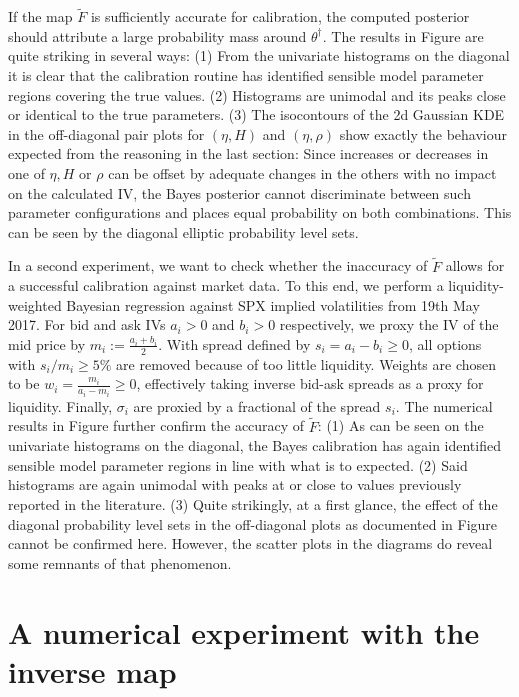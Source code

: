 \documentclass{article}
\theoremstyle{remark}
\begin{document}
If the map $\widetilde{F}$ is sufficiently accurate for calibration, the
computed posterior should attribute a large probability mass around
$\theta^\dagger$. The results in Figure 
are quite striking in several ways: (1) From the univariate histograms on the
diagonal it is clear that the calibration routine has identified sensible
model parameter regions covering the true values. (2) Histograms are unimodal
and its peaks close or identical to the true parameters. (3) The isocontours
of the 2d Gaussian KDE in the off-diagonal pair plots for $(\eta, H)$ and
$(\eta, \rho)$ show exactly the behaviour expected from the reasoning in the
last section: Since increases or decreases in one of $\eta, H$ or $\rho$ can
be offset by adequate changes in the others with no impact on the calculated
IV, the Bayes posterior cannot discriminate between such parameter
configurations and places equal probability on both combinations. This can be
seen by the diagonal elliptic probability level sets.

In a second experiment, we want to check whether the inaccuracy of
$\widetilde{F}$ allows for a successful calibration against market data. To
this end, we perform a liquidity-weighted Bayesian regression against SPX
implied volatilities from 19th May 2017.  For bid and ask IVs $a_i > 0$ and
$b_i >0$ respectively, we proxy the IV of the mid price by
$m_i := \frac{a_i + b_i}{2}$.  With spread defined by
$s_i = a_i - b_i \geq 0$, all options with $s_i/m_i \geq 5\%$ are removed
because of too little liquidity. Weights are chosen to be
$w_i = \frac{m_i}{a_i - m_i} \geq 0$, effectively taking inverse bid-ask
spreads as a proxy for liquidity. Finally, $\sigma_i$ are proxied by a
fractional of the spread $s_i$. The numerical results in Figure
 further confirm the accuracy of
$\widetilde{F}$: (1) As can be seen on the univariate histograms on the diagonal,
the Bayes calibration has again identified sensible model parameter regions in
line with what is to expected. (2) Said histograms are again unimodal with
peaks at or close to values previously reported in the literature. (3) Quite
strikingly, at a first glance, the effect of the diagonal probability level
sets in the off-diagonal plots as documented in Figure
cannot be confirmed here. However,
the scatter plots in the diagrams do reveal some remnants of that phenomenon.

\appendix
\section{A numerical experiment with the inverse map }
\label{sec:Inverse Map}
\end{document}
